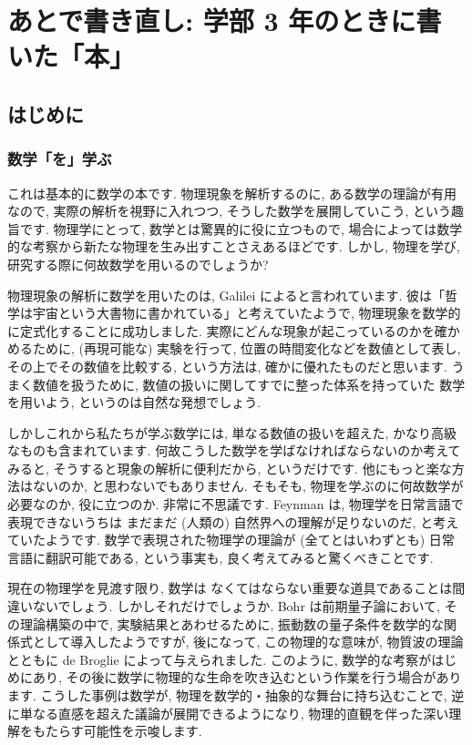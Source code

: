 \documentclass[openany, a4paper, oneside]{jsbook}
\begin{document}
\chapter{あとで書き直し: 学部 3 年のときに書いた「本」}

\section{はじめに}

\subsection{数学「を」学ぶ}

これは基本的に数学の本です.
物理現象を解析するのに, ある数学の理論が有用なので,
実際の解析を視野に入れつつ, そうした数学を展開していこう, という趣旨です.
物理学にとって, 数学とは驚異的に役に立つもので,
場合によっては数学的な考察から新たな物理を生み出すことさえあるほどです.
しかし, 物理を学び, 研究する際に何故数学を用いるのでしょうか?

物理現象の解析に数学を用いたのは, Galilei によると言われています.
彼は「哲学は宇宙という大書物に書かれている」と考えていたようで,
物理現象を数学的に定式化することに成功しました.
実際にどんな現象が起こっているのかを確かめるために, (再現可能な) 実験を行って,
位置の時間変化などを数値として表し, その上でその数値を比較する,
という方法は, 確かに優れたものだと思います.
うまく数値を扱うために, 数値の扱いに関してすでに整った体系を持っていた
数学を用いよう, というのは自然な発想でしょう.

しかしこれから私たちが学ぶ数学には, 単なる数値の扱いを超えた,
かなり高級なものも含まれています.
何故こうした数学を学ばなければならないのか考えてみると,
そうすると現象の解析に便利だから, というだけです.
他にもっと楽な方法はないのか, と思わないでもありません.
そもそも, 物理を学ぶのに何故数学が必要なのか, 役に立つのか.
非常に不思議です.
Feynman は, 物理学を日常言語で表現できないうちは
まだまだ (人類の) 自然界への理解が足りないのだ, と考えていたようです.
数学で表現された物理学の理論が (全てとはいわずとも) 日常言語に翻訳可能である,
という事実も, 良く考えてみると驚くべきことです.

現在の物理学を見渡す限り, 数学は
なくてはならない重要な道具であることは間違いないでしょう.
しかしそれだけでしょうか.
Bohr は前期量子論において, その理論構築の中で, 実験結果とあわせるために,
振動数の量子条件を数学的な関係式として導入したようですが,
後になって, この物理的な意味が, 物質波の理論とともに
de Broglie によって与えられました.
このように, 数学的な考察がはじめにあり,
その後に数学に物理的な生命を吹き込むという作業を行う場合があります.
こうした事例は数学が, 物理を数学的・抽象的な舞台に持ち込むことで,
逆に単なる直感を超えた議論が展開できるようになり,
物理的直観を伴った深い理解をもたらす可能性を示唆します.
\end{document}
